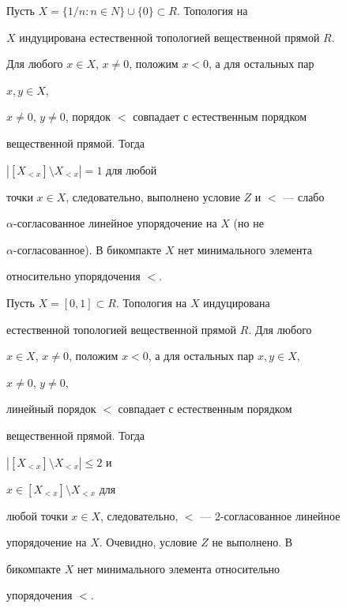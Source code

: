 \begin{exam} Пусть $X=\{1/n:n\in N\}\cup\{0\}\subset R$. Топология на  


$X$ индуцирована естественной топологией вещественной прямой $R$.  


Для любого $x\in X$, $x\ne0$, положим $x<0$, а для остальных пар 


$x,y\in X$, 


$x\ne0$, $y\ne0$, порядок $<$ совпадает с естественным порядком 


вещественной прямой. Тогда 


$|[X_{<x}]\setminus X_{<x}|=1$ для любой  


точки $x\in X$, следовательно, выполнено условие $Z$ и $<$ --- слабо 


$\alpha$-согласованное линейное упорядочение на $X$ (но не 


$\alpha$-согласованное). В бикомпакте $X$ нет минимального элемента  


относительно упорядочения $<$. 


\end{exam} 


 


\begin{exam} Пусть $X=[0,1]\subset R$. Топология на $X$ индуцирована  


естественной топологией вещественной прямой $R$. Для любого 


$x\in X$, $x\ne0$, положим $x<0$, а для остальных пар $x,y\in X$, 


$x\ne0$, $y\ne0$, 


линейный порядок $<$ совпадает с естественным порядком  


вещественной прямой. Тогда 


$|[X_{<x}]\setminus X_{<x}|\le 2$ и 


$x\in[X_{<x}]\setminus X_{<x}$ для 


любой точки $x\in X$, следовательно, $<$ --- 2-согласованное линейное  


упорядочение на $X$. Очевидно, условие $Z$ не выполнено. В  


бикомпакте $X$ нет минимального элемента относительно  


упорядочения $<$. 


\end{exam} 


 


